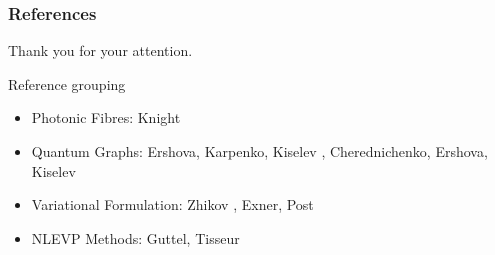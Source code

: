 \documentclass{beamer}
\begin{document}
\begin{frame}[allowframebreaks]
	\frametitle{References}
	
	Thank you for your attention.
	
	\begin{block}{Reference grouping}
		\begin{itemize}
			\item Photonic Fibres: Knight \cite{knight2003photonic}
			\item Quantum Graphs: Ershova, Karpenko, Kiselev \cite{ershova2014isospectrality}, Cherednichenko, Ershova, Kiselev \cite{cherednichenko2019time}
			\item Variational Formulation: Zhikov \cite{zhikov2000extension}, Exner, Post \cite{exner2005convergence}
			\item NLEVP Methods: Guttel, Tisseur \cite{guttel2017nonlinear}
		\end{itemize}
	\end{block}
	
	
	
\end{frame}
\end{document}
